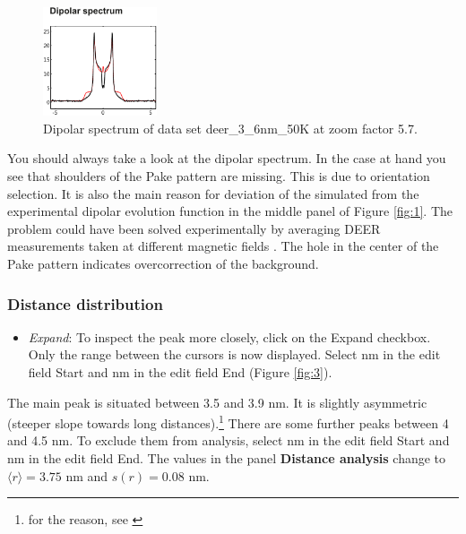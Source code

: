 \documentclass[11pt,a4paper]{article}
\begin{document}
\begin{figure}[ht]
 \vspace{10mm}
 	\begin{center}
		\includegraphics[width=0.30\textwidth]{figure2.pdf}
	\end{center}
	\caption{Dipolar spectrum of data set {\ttfamily deer\_3\_6nm\_50K} at zoom factor 5.7.}
	\label{fig:2}
\end{figure}

You should always take a look at the dipolar spectrum. In the case at hand you see that shoulders of the Pake pattern are missing. This is due to orientation selection. It is also the main reason for deviation of the simulated from the experimental dipolar evolution function in the middle panel of Figure \ref{fig:1}. The problem could have been solved experimentally by averaging DEER measurements taken at different magnetic fields \cite{godt2006}. The hole in the center of the Pake pattern indicates overcorrection of the background.

\subsubsection*{Distance distribution}
\begin{itemize}
	\item \emph{Expand}: To inspect the peak more closely, click on the {\ttfamily Expand} checkbox. Only the range between the cursors is now displayed. Select {} nm in the edit field {\ttfamily Start} and {} nm in the edit field {\ttfamily End} (Figure \ref{fig:3}). 
\end{itemize}

The main peak is situated between 3.5 and 3.9 nm. It is slightly asymmetric (steeper slope towards long distances).\footnote{for the reason, see \cite{godt2006}} There are some further peaks between 4 and 4.5 nm. To exclude them from analysis, select {} nm in the edit field {\ttfamily Start} and {} nm in the edit field {\ttfamily End}. The values in the panel {\ttfamily \bf Distance analysis} change to $\langle r \rangle = 3.75$ nm and $s(r) = 0.08$ nm.
\end{document}

